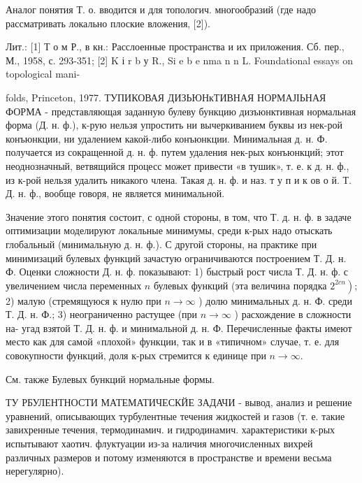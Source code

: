\documentclass[10pt]{article}
\begin{document}
Аналог понятия Т. о. вводится и для топологич. многообразий (где надо рассматривать локально плоские вложения, [2]).



Лит.: [1] Т о м Р., в кн.: Расслоенные пространства и их приложения. Сб. пер., М., 1958, с. 293-351; [2] K і r b у R., Si e b e nma n n L. Foundational essays on topological mani-

folds, Princeton, 1977. ТУПИКОВАЯ ДИЗЬЮНкТИВНАЯ НОРМАЈІЬНАЯ ФОРМА - представляющая заданную булеву бункцию дизъюнктивная нормальная форма (Д. н. ф.), к-рую нельзя упростить ни вычеркиванием буквы из нек-рой конъюнкции, ни удалением какой-либо конъюнкции. Минимальная д. н. Ф. получается из сокращенной д. н. ф. путем удаления нек-рых конъюнкций; этот неоднозначный, ветвящийся процесс может привести «в тушик», т. е. к д. н. ф., из к-рой нельзя удалить никакого члена. Такая д. н. ф. и наз. т у п и к ов о й. Т. Д. н. ф., вообще говоря, не является минимальной.



Значение этого понятия состоит, с одной стороны, в том, что Т. д. н. ф. в задаче оптимизации моделируют локальные минимумы, среди к-рых надо отыскать глобальный (минимальную д. н. ф.). С другой стороны, на практике при минимизаций булевых функций зачастую ограничиваются построением Т. Д. н. Ф. Оценки сложности Д. н. ф. показывают: 1) быстрый рост числа Т. Д. н. ф. с увеличением числа переменных $n$ булевых функций (эта величина порядка $\left.2^{2 c n}\right)$; 2) малую (стремящуюся к нулю при $n \rightarrow \infty$ ) долю минимальных д. н. Ф. среди Т. Д. н. Ф.; 3) неограниченно растущее (при $n \rightarrow \infty$ ) расхождение в сложности на- угад взятой Т. Д. н. ф. и минимальной д. н. Ф. Перечисленные факты имеют место как для самой «плохой» функции, так и в «типичном» случае, т. е. для совокупности функций, доля к-рых стремится к единице при $n \rightarrow \infty$.



См. также Булевых бункций нормальные формы.



ТУ РБУЛЕНТНОСТИ МАТЕМАТИЧЕСКЙЕ ЗАДАЧИ - вывод, анализ и решение уравнений, описывающих турбулентные течения жидкостей и газов (т. е. такие завихренные течения, термодинамич. и гидродинамич. характеристики к-рых испытывают хаотич. флуктуации из-за наличия многочисленных вихрей различных размеров и потому изменяются в пространстве и времени весьма нерегулярно).
\end{document}
